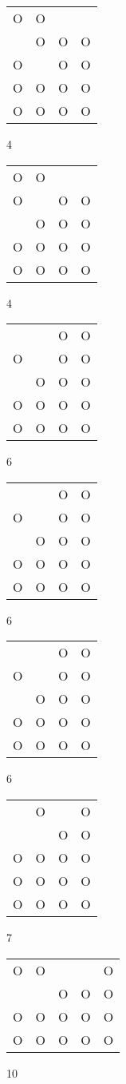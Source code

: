 \begin{tabular}{|m{0.2cm}m{0.2cm}m{0.2cm}m{0.2cm}|}\hline
O&O& & \\
 &O&O&O\\
O& &O&O\\
O&O&O&O\\
O&O&O&O\\
\hline\end{tabular}4
\begin{tabular}{|m{0.2cm}m{0.2cm}m{0.2cm}m{0.2cm}|}\hline
O&O& & \\
O& &O&O\\
 &O&O&O\\
O&O&O&O\\
O&O&O&O\\
\hline\end{tabular}4
\begin{tabular}{|m{0.2cm}m{0.2cm}m{0.2cm}m{0.2cm}|}\hline
 & &O&O\\
O& &O&O\\
 &O&O&O\\
O&O&O&O\\
O&O&O&O\\
\hline\end{tabular}6
\begin{tabular}{|m{0.2cm}m{0.2cm}m{0.2cm}m{0.2cm}|}\hline
 & &O&O\\
O& &O&O\\
 &O&O&O\\
O&O&O&O\\
O&O&O&O\\
\hline\end{tabular}6
\begin{tabular}{|m{0.2cm}m{0.2cm}m{0.2cm}m{0.2cm}|}\hline
 & &O&O\\
O& &O&O\\
 &O&O&O\\
O&O&O&O\\
O&O&O&O\\
\hline\end{tabular}6
\begin{tabular}{|m{0.2cm}m{0.2cm}m{0.2cm}m{0.2cm}|}\hline
 &O& &O\\
 & &O&O\\
O&O&O&O\\
O&O&O&O\\
O&O&O&O\\
\hline\end{tabular}7
\begin{tabular}{|m{0.2cm}m{0.2cm}m{0.2cm}m{0.2cm}m{0.2cm}|}\hline
O&O& & &O\\
 & &O&O&O\\
O&O&O&O&O\\
O&O&O&O&O\\
\hline\end{tabular}10
